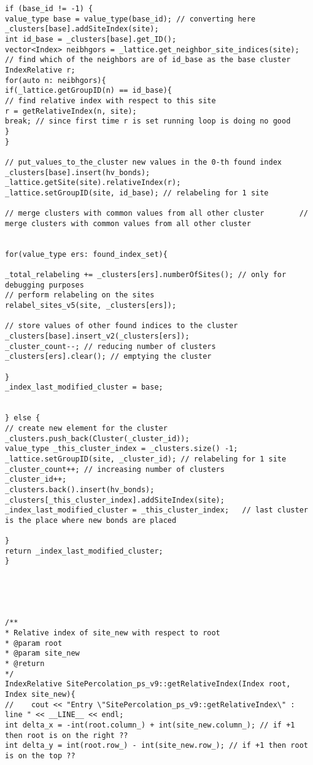 \begin{lstlisting}[style=CStyle]
if (base_id != -1) {
value_type base = value_type(base_id); // converting here
_clusters[base].addSiteIndex(site);
int id_base = _clusters[base].get_ID();
vector<Index> neibhgors = _lattice.get_neighbor_site_indices(site);
// find which of the neighbors are of id_base as the base cluster
IndexRelative r;
for(auto n: neibhgors){
if(_lattice.getGroupID(n) == id_base){
// find relative index with respect to this site
r = getRelativeIndex(n, site);
break; // since first time r is set running loop is doing no good
}
}

// put_values_to_the_cluster new values in the 0-th found index
_clusters[base].insert(hv_bonds);
_lattice.getSite(site).relativeIndex(r);
_lattice.setGroupID(site, id_base); // relabeling for 1 site

// merge clusters with common values from all other cluster        // merge clusters with common values from all other cluster


for(value_type ers: found_index_set){

_total_relabeling += _clusters[ers].numberOfSites(); // only for debugging purposes
// perform relabeling on the sites
relabel_sites_v5(site, _clusters[ers]);

// store values of other found indices to the cluster
_clusters[base].insert_v2(_clusters[ers]);
_cluster_count--; // reducing number of clusters
_clusters[ers].clear(); // emptying the cluster

}
_index_last_modified_cluster = base;


} else {
// create new element for the cluster
_clusters.push_back(Cluster(_cluster_id));
value_type _this_cluster_index = _clusters.size() -1;
_lattice.setGroupID(site, _cluster_id); // relabeling for 1 site
_cluster_count++; // increasing number of clusters
_cluster_id++;
_clusters.back().insert(hv_bonds);
_clusters[_this_cluster_index].addSiteIndex(site);
_index_last_modified_cluster = _this_cluster_index;   // last cluster is the place where new bonds are placed

}
return _index_last_modified_cluster;
}





/**
* Relative index of site_new with respect to root
* @param root
* @param site_new
* @return
*/
IndexRelative SitePercolation_ps_v9::getRelativeIndex(Index root, Index site_new){
//    cout << "Entry \"SitePercolation_ps_v9::getRelativeIndex\" : line " << __LINE__ << endl;
int delta_x = -int(root.column_) + int(site_new.column_); // if +1 then root is on the right ??
int delta_y = int(root.row_) - int(site_new.row_); // if +1 then root is on the top ??



\end{lstlisting}
